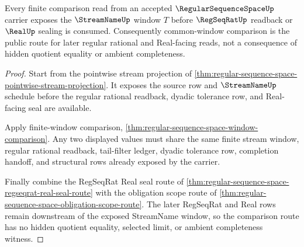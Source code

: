 \begin{theorem}
\label{thm:regular-sequence-space-streamname-window-route}
Every finite comparison read from an accepted $\RegularSequenceSpaceUp$ carrier exposes the $\StreamNameUp$ window $T$ before $\RegSeqRatUp$ readback or $\RealUp$ sealing is consumed. Consequently common-window comparison is the public route for later regular rational and Real-facing reads, not a consequence of hidden quotient equality or ambient completeness.
\end{theorem}
\begin{proof}
Start from the pointwise stream projection of \autoref{thm:regular-sequence-space-pointwise-stream-projection}. It exposes the source row and $\StreamNameUp$ schedule before the regular rational readback, dyadic tolerance row, and Real-facing seal are available.

Apply finite-window comparison, \autoref{thm:regular-sequence-space-window-comparison}. Any two displayed values must share the same finite stream window, regular rational readback, tail-filter ledger, dyadic tolerance row, completion handoff, and structural rows already exposed by the carrier.

Finally combine the RegSeqRat Real seal route of \autoref{thm:regular-sequence-space-regseqrat-real-seal-route} with the obligation scope route of \autoref{thm:regular-sequence-space-obligation-scope-route}. The later RegSeqRat and Real rows remain downstream of the exposed StreamName window, so the comparison route has no hidden quotient equality, selected limit, or ambient completeness witness.
\end{proof}

